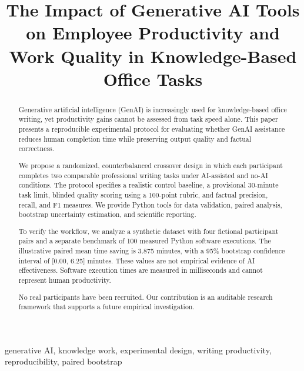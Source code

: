 \documentclass[conference]{IEEEtran}
\title{The Impact of Generative AI Tools on Employee Productivity and Work Quality in Knowledge-Based Office Tasks}
\author{
  \IEEEauthorblockN{Muratbek Ramazan}
  \IEEEauthorblockA{Narxoz University\\Almaty, Kazakhstan}
  \and
  \IEEEauthorblockN{Tasbolatkyzy Zhanerke}
  \IEEEauthorblockA{Narxoz University\\Almaty, Kazakhstan}
}
\begin{document}
\maketitle


\begin{abstract}
Generative artificial intelligence (GenAI) is increasingly
used for knowledge-based office writing, yet productivity
gains cannot be assessed from task speed alone. This paper
presents a reproducible experimental protocol for evaluating
whether GenAI assistance reduces human completion time while
preserving output quality and factual correctness.

We propose a randomized, counterbalanced crossover design
in which each participant completes two comparable professional
writing tasks under AI-assisted and no-AI conditions. The
protocol specifies a realistic control baseline, a provisional
30-minute task limit, blinded quality scoring using a
100-point rubric, and factual precision, recall, and F1
measures. We provide Python tools for data validation,
paired analysis, bootstrap uncertainty estimation,
and scientific reporting.

To verify the workflow, we analyze a synthetic dataset
with four fictional participant pairs and a separate
benchmark of 100 measured Python software executions.
The illustrative paired mean time saving is 3.875 minutes,
with a 95\% bootstrap confidence interval of
[0.00, 6.25] minutes. These values are not empirical
evidence of AI effectiveness. Software execution times
are measured in milliseconds and cannot represent
human productivity.

No real participants have been recruited. Our contribution
is an auditable research framework that supports a future
empirical investigation.
\end{abstract}

\begin{IEEEkeywords}
generative AI, knowledge work, experimental design,
writing productivity, reproducibility, paired bootstrap
\end{IEEEkeywords}









\end{document}
